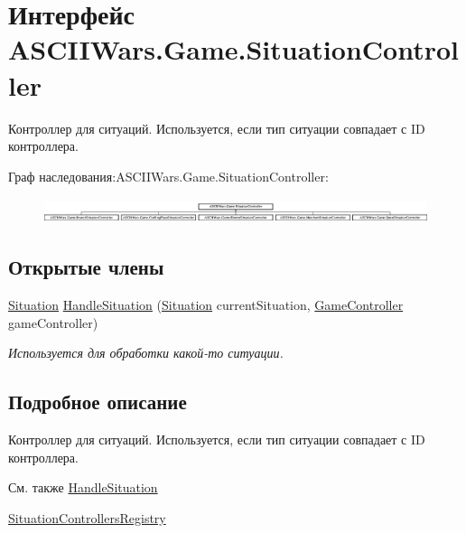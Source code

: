 \hypertarget{interface_a_s_c_i_i_wars_1_1_game_1_1_situation_controller}{}\section{Интерфейс A\+S\+C\+I\+I\+Wars.\+Game.\+Situation\+Controller}
\label{interface_a_s_c_i_i_wars_1_1_game_1_1_situation_controller}


Контроллер для ситуаций. Используется, если тип ситуации совпадает с ID контроллера.  


Граф наследования\+:A\+S\+C\+I\+I\+Wars.\+Game.\+Situation\+Controller\+:\begin{figure}[H]
\begin{center}
\leavevmode
\includegraphics[height=0.741722cm]{interface_a_s_c_i_i_wars_1_1_game_1_1_situation_controller}
\end{center}
\end{figure}
\subsection*{Открытые члены}
\begin{DoxyCompactItemize}
\item 
\hyperlink{class_a_s_c_i_i_wars_1_1_game_1_1_situation}{Situation} \hyperlink{interface_a_s_c_i_i_wars_1_1_game_1_1_situation_controller_a2cf0359dfc1683beb63f0dfed1c372e6}{Handle\+Situation} (\hyperlink{class_a_s_c_i_i_wars_1_1_game_1_1_situation}{Situation} current\+Situation, \hyperlink{class_a_s_c_i_i_wars_1_1_game_1_1_game_controller}{Game\+Controller} game\+Controller)
\begin{DoxyCompactList}\small\item\em Используется для обработки какой-\/то ситуации. \end{DoxyCompactList}\end{DoxyCompactItemize}


\subsection{Подробное описание}
Контроллер для ситуаций. Используется, если тип ситуации совпадает с ID контроллера. 

\begin{DoxySeeAlso}{См. также}
\hyperlink{interface_a_s_c_i_i_wars_1_1_game_1_1_situation_controller_a2cf0359dfc1683beb63f0dfed1c372e6}{Handle\+Situation} 

\hyperlink{class_a_s_c_i_i_wars_1_1_game_1_1_situation_controllers_registry}{Situation\+Controllers\+Registry} 
\end{DoxySeeAlso}


